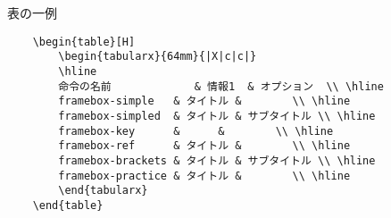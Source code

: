 \begin{multicols*}{2}
\begin{framebox-ref}{表の一例}
{\selectsize{6pt}{7pt}
\begin{verbatim}
    \begin{table}[H]
        \begin{tabularx}{64mm}{|X|c|c|}
        \hline
        命令の名前             & 情報1  & オプション  \\ \hline
        framebox-simple   & タイトル &        \\ \hline
        framebox-simpled  & タイトル & サブタイトル \\ \hline
        framebox-key      &      &        \\ \hline
        framebox-ref      & タイトル &        \\ \hline
        framebox-brackets & タイトル & サブタイトル \\ \hline
        framebox-practice & タイトル &        \\ \hline
        \end{tabularx}
    \end{table}
\end{verbatim}
}
\end{framebox-ref}



\end{multicols*}
